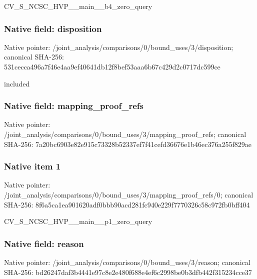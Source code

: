 \documentclass[10pt,a4paper]{article}
\begin{document}
\begingroup\raggedright\sloppy CV\_\allowbreak{}S\_\allowbreak{}NCSC\_\allowbreak{}HVP\_\allowbreak{}\_\allowbreak{}main\_\allowbreak{}\_\allowbreak{}b4\_\allowbreak{}zero\_\allowbreak{}query\par\endgroup

\subsubsection{Native field: disposition}
Native pointer: /joint\_\allowbreak{}analysis/comparisons/0/bound\_\allowbreak{}uses/3/disposition; canonical SHA-256: 531cecca496a7f46e4aa9ef40641db12f8bef53aaa6b67c429d2c0717dc599ce

\begingroup\raggedright\sloppy included\par\endgroup

\subsubsection{Native field: mapping\_\allowbreak{}proof\_\allowbreak{}refs}
Native pointer: /joint\_\allowbreak{}analysis/comparisons/0/bound\_\allowbreak{}uses/3/mapping\_\allowbreak{}proof\_\allowbreak{}refs; canonical SHA-256: 7a20bc6903e82e915c73328b52337ef7f41cefd36676e1b46ec376a255f829ae

\subsubsection{Native item 1}
Native pointer: /joint\_\allowbreak{}analysis/comparisons/0/bound\_\allowbreak{}uses/3/mapping\_\allowbreak{}proof\_\allowbreak{}refs/0; canonical SHA-256: 8f6a5ca1ea901620adf0bbb90acd281fc940e229f7770326c58c972fb0bff404

\begingroup\raggedright\sloppy CV\_\allowbreak{}S\_\allowbreak{}NCSC\_\allowbreak{}HVP\_\allowbreak{}\_\allowbreak{}main\_\allowbreak{}\_\allowbreak{}p1\_\allowbreak{}zero\_\allowbreak{}query\par\endgroup

\subsubsection{Native field: reason}
Native pointer: /joint\_\allowbreak{}analysis/comparisons/0/bound\_\allowbreak{}uses/3/reason; canonical SHA-256: bd26247daf3b4441e97c8e2e480f688e4ef6c2998be0b3dfb442f315234cce37
\end{document}
